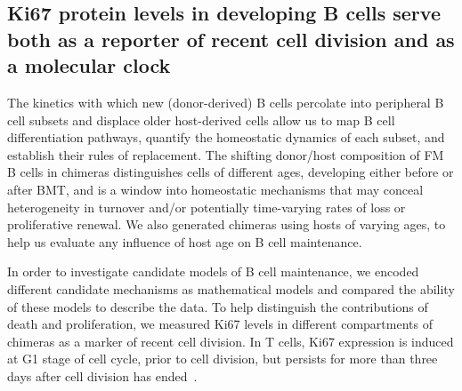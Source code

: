 \documentclass[12pt]{article}
\begin{document}
\subsection*{Ki67 protein levels in developing B cells serve both as a reporter of recent cell division and as a molecular clock}
The kinetics with which new (donor-derived) B cells percolate into peripheral B cell subsets and displace older host-derived cells allow us to map B cell differentiation pathways,  quantify the homeostatic dynamics of each subset, and establish their rules of replacement.
The shifting donor/host composition of FM B cells in chimeras distinguishes cells of different ages, developing either before or after BMT, and is a window into homeostatic mechanisms that may conceal heterogeneity in turnover and/or potentially time-varying rates of loss or proliferative renewal. We also generated chimeras using hosts of varying ages, to help us evaluate any influence of host age on B cell maintenance. 
	

In order to investigate candidate models of B cell maintenance, we encoded different candidate mechanisms as mathematical models and compared the ability of these models to describe the data. 
To help distinguish the contributions of death and proliferation, we measured Ki67 levels in different compartments of chimeras as a marker of recent cell division. In T cells, Ki67 expression is induced at G1 stage of cell cycle, prior to cell division, but persists for more than three days after cell division has ended~\citep{Gossel:2017iu,Hogan:2013id}. 
\end{document}
